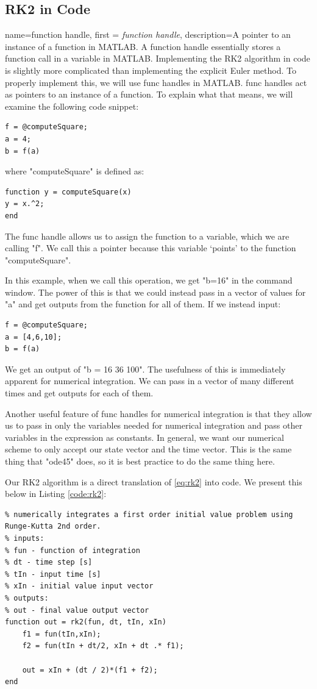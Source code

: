 \documentclass[12pt]{report}
\begin{document}
\subsection{RK2 in Code}
{
    name=function handle,
    first = {\textit{function handle}},
    description={A pointer to an instance of a function in MATLAB. A function handle essentially stores a function call in a variable in MATLAB.}
}
Implementing the RK2 algorithm in code is slightly more complicated than implementing the explicit Euler method. To properly implement this, we will use \glspl{func handle} in MATLAB. \Glspl{func handle} act as pointers to an instance of a function. To explain what that means, we will examine the following code snippet:
\begin{lstlisting}[style=Matlab-editor]
f = @computeSquare;
a = 4;
b = f(a)
\end{lstlisting}
where "computeSquare" is defined as:
\lstset{style=mystyle}
\begin{lstlisting}[style=Matlab-editor]
function y = computeSquare(x)
y = x.^2;
end
\end{lstlisting}
The \gls{func handle} allows us to assign the function to a variable, which we are calling "f". We call this a pointer because this variable ‘points’ to the function "computeSquare".

In this example, when we call this operation, we get "b=16" in the command window. The power of this is that we could instead pass in a vector of values for "a" and get outputs from the function for all of them. If we instead input:
\begin{lstlisting}[style=Matlab-editor]
f = @computeSquare;
a = [4,6,10];
b = f(a)
\end{lstlisting}
We get an output of "b = 16  36  100". The usefulness of this is immediately apparent for numerical integration. We can pass in a vector of many different times and get outputs for each of them. 

Another useful feature of \glspl{func handle} for numerical integration is that they allow us to pass in only the variables needed for numerical integration and pass other variables in the expression as constants. In general, we want our numerical scheme to only accept our \gls{state vector} and the time vector. This is the same thing that "ode45" does, so it is best practice to do the same thing here.

Our RK2 algorithm is a direct translation of \eqref{eq:rk2} into code. We present this below in Listing \ref{code:rk2}:
\begin{lstlisting}[style=Matlab-editor, caption=RK2 Integrator]
%% RK2 Integrator
% numerically integrates a first order initial value problem using Runge-Kutta 2nd order.
% inputs:
% fun - function of integration
% dt - time step [s]
% tIn - input time [s]
% xIn - initial value input vector
% outputs:
% out - final value output vector
function out = rk2(fun, dt, tIn, xIn)
    f1 = fun(tIn,xIn);
    f2 = fun(tIn + dt/2, xIn + dt .* f1);
    
    out = xIn + (dt / 2)*(f1 + f2);
end
\end{lstlisting}\label{code:rk2}
\end{document}
